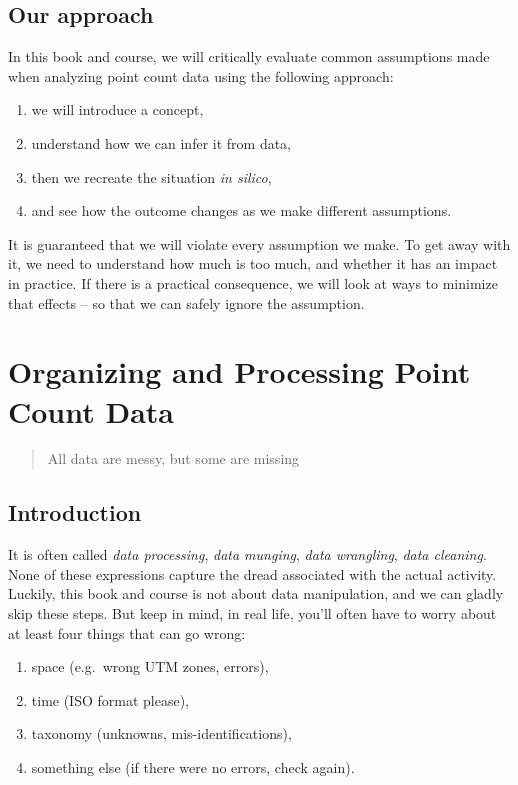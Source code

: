 \documentclass[12pt,]{book}
\providecommand{\tightlist}{%
  \setlength{\itemsep}{0pt}\setlength{\parskip}{0pt}}
\begin{document}
\hypertarget{our-approach}{%
\section{Our approach}\label{our-approach}}

In this book and course, we will critically evaluate common assumptions made
when analyzing point count data using the following approach:

\begin{enumerate}
\def\labelenumi{\arabic{enumi}.}
\tightlist
\item
  we will introduce a concept,
\item
  understand how we can infer it from data,
\item
  then we recreate the situation \emph{in silico},
\item
  and see how the outcome changes as we make different assumptions.
\end{enumerate}

It is guaranteed that we will violate every assumption we make.
To get away with it, we need to understand how much is too much,
and whether it has an impact in practice.
If there is a practical consequence, we will look at ways to minimize
that effects -- so that we can safely ignore the assumption.

\hypertarget{pcdata}{%
\chapter{Organizing and Processing Point Count Data}\label{pcdata}}

\begin{quote}
All data are messy, but some are missing
\end{quote}

\hypertarget{introduction}{%
\section{Introduction}\label{introduction}}

It is often called \emph{data processing}, \emph{data munging},
\emph{data wrangling}, \emph{data cleaning}.
None of these expressions capture the dread associated with the actual activity.
Luckily, this book and course is not about data manipulation,
and we can gladly skip these steps. But keep in mind,
in real life, you'll often have to worry about at least four things
that can go wrong:

\begin{enumerate}
\def\labelenumi{\arabic{enumi}.}
\tightlist
\item
  space (e.g.~wrong UTM zones, errors),
\item
  time (ISO format please),
\item
  taxonomy (unknowns, mis-identifications),
\item
  something else (if there were no errors, check again).
\end{enumerate}
\end{document}
